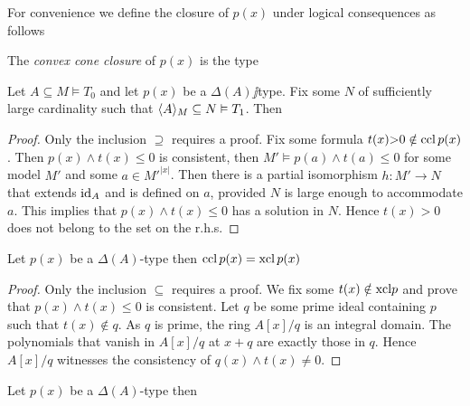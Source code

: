 \documentclass[creche.tex]{subfiles}
\begin{document}
For convenience we define the closure of $p(x)$ under logical consequences as follows


The \emph{convex cone closure\/} of $p(x)$ is the type 

\def\xcl{{\rm xcl}}

\begin{proposition}\label{prop_Nullstellensatz}
Let $A\subseteq M\models T_0$ and let $p(x)$ be a $\Delta(A)\jj$type. Fix some $N$ of sufficiently large cardinality such that $\langle A\rangle_M\subseteq N\vDash T_1$. Then 


\end{proposition}


\begin{proof} Only the inclusion $\supseteq$ requires a proof.  Fix some formula $t(x){>}0\notin{\rm ccl}\, p(x)$. Then $p(x)\wedge t(x)\le0$ is consistent, then $M'\models p(a)\wedge t(a)\leq0$ for some model $M'$ and some $a\in {M'}^{|x|}$. Then there is a partial isomorphism $h:M'\to N$ that extends $\textrm{id}_A$ and is defined on $a$, provided $N$ is large enough to accommodate $a$. This implies that $p(x)\wedge t(x)\leq0$ has a solution in $N$. Hence $t(x)>0$ does not belong to the set on the r.h.s.  
\end{proof}

\begin{proposition}
Let $p(x)$ be a $\Delta(A)$-type then $\ccl\, p(x)=\xcl\,p(x)$
\end{proposition}


\begin{proof} Only the inclusion $\subseteq$ requires a proof. We fix some $t(x)\notin\xcl p$ and prove that $p(x)\wedge t(x)\leq0$ is consistent. Let $q$ be some prime ideal containing $p$ such that $t(x)\notin q$.  As $q$ is prime, the ring $A[x]/q$ is an integral domain. The polynomials that vanish in  $A[x]/q$ at $x+q$ are exactly those in $q$. Hence $A[x]/q$ witnesses the consistency of $q(x)\wedge t(x)\neq0$.
\end{proof}





\begin{proposition}
Let $p(x)$ be a $\Delta(A)$-type then 
\end{proposition}
\end{document}
